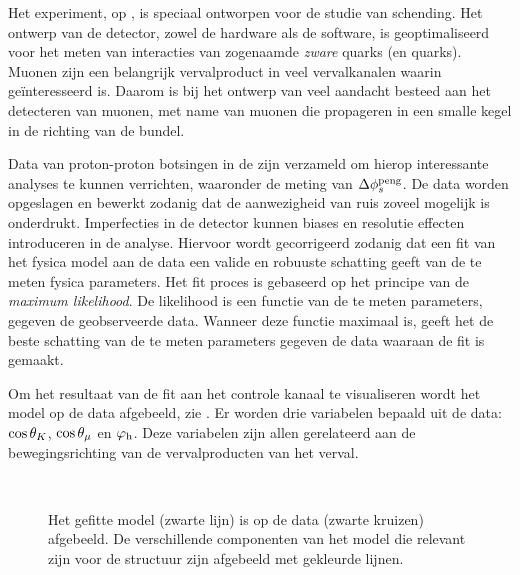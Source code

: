 Het \lhcb experiment, op \cern, is speciaal ontworpen voor de studie van \CP schending.
Het ontwerp van de detector, zowel de hardware als de software, is geoptimaliseerd voor het meten
van interacties van zogenaamde {\it zware} quarks (\bquark en \cquark quarks). Muonen zijn een
belangrijk vervalproduct in veel vervalkanalen waarin \lhcb ge\"interesseerd is.
Daarom is bij het ontwerp van \lhcb veel aandacht besteed aan het detecteren van muonen,
met name van muonen die propageren in een smalle kegel in de richting van de bundel.

Data van proton-proton botsingen in de \lhc zijn verzameld om hierop interessante analyses te
kunnen verrichten, waaronder de meting van  $\Delta\phi_{s}^{\tiny\text{peng}}$. De data worden opgeslagen en
bewerkt zodanig dat de aanwezigheid van ruis zoveel mogelijk is onderdrukt. Imperfecties in de
detector kunnen biases en resolutie effecten introduceren in de analyse. Hiervoor wordt gecorrigeerd
zodanig dat een fit van het fysica model aan de data een valide en robuuste schatting geeft van de te
meten fysica parameters. Het fit proces is gebaseerd op het principe van de {\it maximum likelihood}.
De likelihood is een functie van de te meten parameters, gegeven de geobserveerde data. Wanneer deze functie maximaal is, geeft
het de beste schatting van de te meten parameters gegeven de data waaraan de fit is gemaakt.

Om het resultaat van de fit aan het \BsJpsiKst controle kanaal te visualiseren wordt het model op de data
afgebeeld, zie . Er worden drie variabelen bepaald uit de data: $\cos\theta_{K}$,
$\cos\theta_{\mu}$ en $\varphi_{\rm h}$. Deze variabelen zijn allen gerelateerd aan de bewegingsrichting van de vervalproducten
van het \BsJpsiKst verval.

\begin{figure}[!t]
  \begin{subfigure}{0.5\textwidth}
    \centering
    \scalebox{1.2}{}
  \end{subfigure}%
  \hfill
  \begin{subfigure}{0.5\textwidth}
    \centering
    \scalebox{1.2}{}
  \end{subfigure}\\
  \begin{subfigure}{\textwidth}
    \centering
    \scalebox{1.2}{}
  \end{subfigure}
  \caption{Het gefitte model (zwarte lijn) is op de \BsJpsiKst data (zwarte kruizen) afgebeeld.
          De verschillende componenten van het model die relevant zijn voor de \CP structuur zijn afgebeeld met gekleurde lijnen.}
  \label{app_nl_angular_plot_thetas}
\end{figure}

